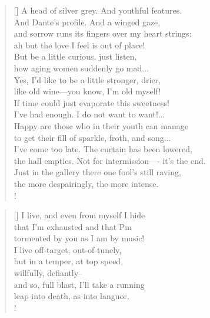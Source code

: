 \documentclass[]{article}
\begin{document}
\settowidth{\versewidth}{A head of silver grey. And youthful features. }
\begin{verse}[\versewidth]
A head of silver grey. And youthful features.\\
And Dante's profile. And a winged gaze,\\
and sorrow runs its fingers over my heart strings:\\
ah but the love I feel is out of place!\\
But be a little curious, just listen,\\
how aging women suddenly go mad...\\
Yes, I'd like to be a little stronger, drier,\\
like old wine—you know, I'm old myself!\\
If time could just evaporate this sweetness!\\
I've had enough. I do not want to want!...\\
Happy are those who in their youth can manage\\
to get their fill of sparkle, froth, and song... \\
I've come too late. The curtain has been lowered,\\
the hall empties. Not for intermission—- it's the end.\\
Just in the gallery there one fool's still raving,\\
the more despairingly, the more intense.\\!
\end{verse}
\bigskip \bigskip

\settowidth{\versewidth}{I live, and even from myself I hide }
\begin{verse}[\versewidth]
I live, and even from myself I hide\\
that I'm exhausted and that Pm\\
tormented by you as I am by music!\\
I live off-target, out-of-tunely,\\
but in a temper, at top speed,\\
willfully, defiantly-- \\
and so, full blast, I'll take a running\\
leap into death, as into languor.\\!
\end{verse}
\bigskip \bigskip
\end{document}
